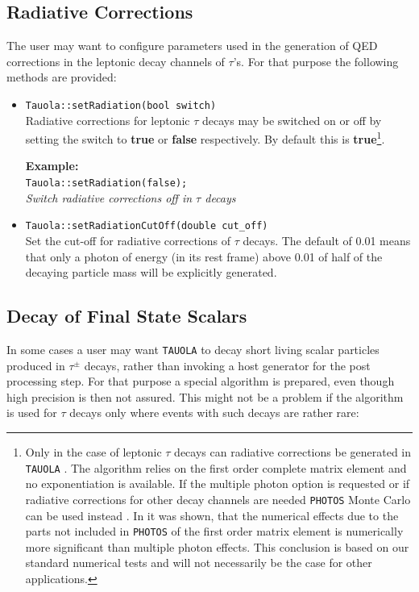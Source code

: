 \documentclass[]{Tauola_interface_design}
\begin{document}
\subsection{Radiative Corrections}
The user may want to configure parameters used in the generation of QED corrections in the 
leptonic decay channels of 
$\tau$'s. For that purpose the following methods are provided:
\begin{itemize}
\item {\tt Tauola::setRadiation(bool switch) } \hfill \\
Radiative corrections for leptonic $\tau$ decays may be switched on or off
by setting the switch to \textbf{true} or \textbf{false} respectively.
By default this is \textbf{true}\footnote{Only in the case of leptonic $\tau$ decays
can radiative corrections be generated in {\tt TAUOLA} \cite{Jezabek:1991qp}.
The algorithm relies on the first order complete matrix element and no 
exponentiation is available. If the multiple photon option is requested or if 
radiative corrections for other decay channels are needed
{\tt PHOTOS} Monte Carlo can be used instead \cite{photosC++}. In \cite{Was:2004dg} it was shown, that the numerical effects due to the parts not included in {\tt PHOTOS} of the first order matrix element is numerically more significant than multiple photon effects. This conclusion is based on our standard numerical tests and will not necessarily be the case for other applications.}.

\noindent \textbf{Example:} \hfill \\
  {\tt Tauola::setRadiation(false); } \\
  \emph{Switch radiative corrections off in $\tau$ decays } \hfill \\
\item {\tt Tauola::setRadiationCutOff(double cut\_off) } \hfill \\
Set the cut-off for radiative corrections of $\tau$ decays. 
The default of 0.01 means that only a photon of energy (in its rest frame) 
above 0.01 of half of the decaying
particle mass will be explicitly generated.
\end{itemize}   


\subsection{Decay of Final State Scalars}
In some cases a user may want {\tt TAUOLA} to decay short living scalar particles
produced in $\tau^\pm$ decays, rather than invoking a host generator for the post processing 
step.
For that purpose a special algorithm is prepared, even though high precision
is then not assured. This might not be a problem if the algorithm is used for $\tau$ decays 
only where 
events with such decays are rather rare:
\end{document}
